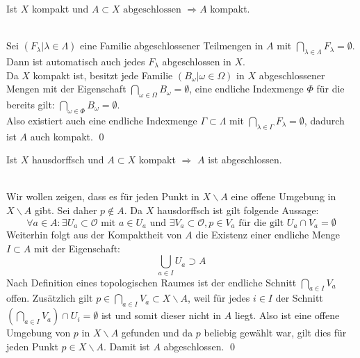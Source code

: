 \begin{Satz}\label{satz:abgeschlkomp}
		Ist \(X\) kompakt und \(A \subset X \mbox{ abgeschlossen } \Rightarrow A\) kompakt.
\end{Satz}
%
	\\
 	Sei \((F_{\lambda} | \lambda \in \Lambda) \) eine Familie abgeschlossener Teilmengen in \(A\) mit \( \bigcap_{\lambda \in \Lambda } F_{\lambda} = \emptyset \).\\
	Dann ist automatisch auch jedes \(F_{\lambda} \) abgeschlossen in \(X\).\\
	Da \(X\) kompakt ist, besitzt jede Familie \((B_{\omega} | \omega \in \Omega) \) in \(X\) abgeschlossener Mengen mit der Eigenschaft 
	\( \bigcap_{\omega \in \Omega} B_{\omega} = \emptyset\), eine 
	endliche Indexmenge \(\Phi \) für die bereits gilt: \( \bigcap_{\omega \in \Phi} B_{\omega} = \emptyset\).\\
	Also existiert auch eine endliche Indexmenge \( \Gamma \subset \Lambda \) mit \( \bigcap_{\lambda \in \Gamma } F_{\lambda} = \emptyset \), dadurch ist 
	\(A\) auch kompakt.
\qed
		
\begin{Satz}\label{satz:kompabgeschl}
	Ist \(X\) hausdorffsch und \(A \subset X \) kompakt \( \Rightarrow \) \(A\) ist abgeschlossen.
\end{Satz}
%
	\\
	Wir wollen zeigen, dass es für jeden Punkt in \(X \backslash A \) eine offene Umgebung in \(X \backslash A \) gibt. Sei daher \(p \notin A \).
	Da \(X\) hausdorffsch ist gilt folgende Aussage:
	\[ \forall a \in A : \exists U_{a} \subset \mathcal{O} \mbox{ mit }  a \in U_{a} \mbox{ und } \exists V_{a}\subset \mathcal{O}, p \in V_{a} 
		 \mbox{ für die gilt } U_{a} \cap V_{a} = \emptyset \] 
	Weiterhin folgt aus der Kompaktheit von \(A\) die Existenz einer endliche Menge \(I \subset A\) mit der Eigenschaft:
	\[ \bigcup_{a \in I} U_{a} \supset A \]
	Nach Definition eines topologischen Raumes ist der endliche Schnitt \(\bigcap_{a \in I} V_{a}\) offen. Zusätzlich gilt 
	\(p \in \bigcap_{a \in I} V_{a} \subset  X\backslash A \), weil für jedes \(i \in I\) der Schnitt \( ( \bigcap_{a \in I} V_a ) \cap U_i = \emptyset \) ist und 
	somit dieser nicht in \(A\) liegt.
	Also ist eine offene Umgebung von \(p\) in \(X\backslash A\) gefunden und da \(p\) beliebig gewählt war, gilt dies für 
	jeden Punkt \(p \in X\backslash A\). Damit ist \(A\) abgeschlossen. 
\qed
	
